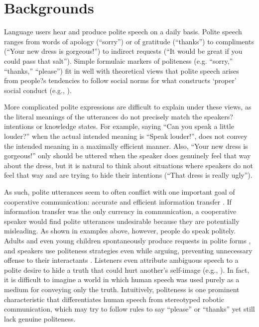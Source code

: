 \section{Backgrounds}\label{sec:backg}

Language users hear and produce polite speech on a daily basis. Polite speech ranges from words of apology (``sorry'') or of gratitude (``thanks'') to compliments (``Your new dress is gorgeous!'') to indirect requests (``It would be great if you could pass that salt''). Simple formulaic markers of politeness (e.g. ``sorry,'' ``thanks,'' ``please'') fit in well with theoretical views that polite speech arises from people?s tendencies to follow social norms for what constructs `proper' social conduct (e.g., \citealt{ide1989}).

More complicated polite expressions are difficult to explain under these views, as the literal meanings of the utterances do not precisely match the speakers? intentions or knowledge states. For example, saying ``Can you speak a little louder?'' when the actual intended meaning is ``Speak louder!'', does not convey the intended meaning in a maximally efficient manner. Also, ``Your new dress is gorgeous!'' only should be uttered when the speaker does genuinely feel that way about the dress, but it is natural to think about situations where speakers do not feel that way and are trying to hide their intentions (``That dress is really ugly'').

As such, polite utterances seem to often conflict with one important goal of cooperative communication: accurate and efficient information transfer \citep{Grice1975}. If information transfer was the only currency in communication, a cooperative speaker would find polite utterances undesirable because they are potentially misleading. As shown in examples above, however, people do speak politely. Adults and even young children spontaneously produce requests in polite forms \citep{clark1980, axia1985}, and speakers use politeness strategies even while arguing, preventing unnecessary offense to their interactants \citep{holtgraves1997}. Listeners even attribute ambiguous speech to a polite desire to hide a truth that could hurt another's self-image (e.g., \citealt{bonnefon2009}). In fact, it is difficult to imagine a world in which human speech was used purely as a medium for conveying only the truth. Intuitively, politeness is one prominent characteristic that differentiates human speech from stereotyped robotic communication, which may try to follow rules to say ``please'' or ``thanks'' yet still lack genuine politeness.

